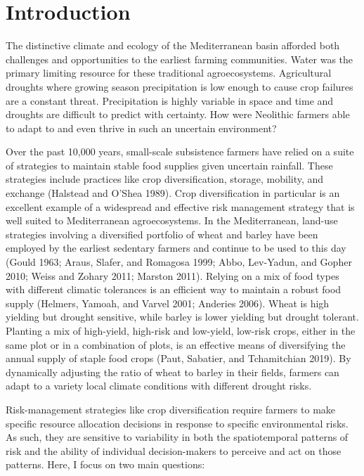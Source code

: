 \documentclass[smallextended]{svjour3}       %
\begin{document}
\def\spacingset#1{\renewcommand{\baselinestretch}%
{#1}\small\normalsize} \spacingset{1}


\hypertarget{intro}{%
\section{Introduction}\label{intro}}

The distinctive climate and ecology of the Mediterranean basin afforded both challenges and opportunities to the earliest farming communities. Water was the primary limiting resource for these traditional agroecosystems. Agricultural droughts where growing season precipitation is low enough to cause crop failures are a constant threat. Precipitation is highly variable in space and time and droughts are difficult to predict with certainty. How were Neolithic farmers able to adapt to and even thrive in such an uncertain environment?

Over the past 10,000 years, small-scale subsistence farmers have relied on a suite of strategies to maintain stable food supplies given uncertain rainfall. These strategies include practices like crop diversification, storage, mobility, and exchange (Halstead and O'Shea 1989). Crop diversification in particular is an excellent example of a widespread and effective risk management strategy that is well suited to Mediterranean agroecosystems. In the Mediterranean, land-use strategies involving a diversified portfolio of wheat and barley have been employed by the earliest sedentary farmers and continue to be used to this day (Gould 1963; Araus, Slafer, and Romagosa 1999; Abbo, Lev-Yadun, and Gopher 2010; Weiss and Zohary 2011; Marston 2011). Relying on a mix of food types with different climatic tolerances is an efficient way to maintain a robust food supply (Helmers, Yamoah, and Varvel 2001; Anderies 2006). Wheat is high yielding but drought sensitive, while barley is lower yielding but drought tolerant. Planting a mix of high-yield, high-risk and low-yield, low-risk crops, either in the same plot or in a combination of plots, is an effective means of diversifying the annual supply of staple food crops (Paut, Sabatier, and Tchamitchian 2019). By dynamically adjusting the ratio of wheat to barley in their fields, farmers can adapt to a variety local climate conditions with different drought risks.

Risk-management strategies like crop diversification require farmers to make specific resource allocation decisions in response to specific environmental risks. As such, they are sensitive to variability in both the spatiotemporal patterns of risk and the ability of individual decision-makers to perceive and act on those patterns. Here, I focus on two main questions:
\end{document}
